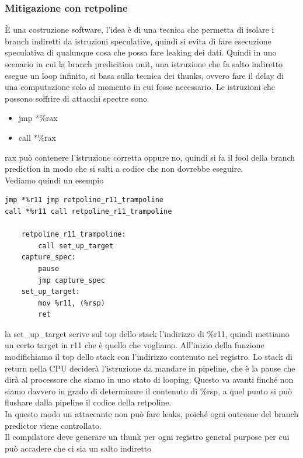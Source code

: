 \documentclass[12pt, oneside]{extbook} %
\begin{document}
\subsubsection{Mitigazione con retpoline}
È una costruzione software, l'idea è di una tecnica che permetta di isolare i branch indiretti da istruzioni speculative, quindi si evita di fare esecuzione speculativa di qualunque cosa che possa fare leaking dei dati. Quindi in uno scenario in cui la branch predicition unit, una istruzione che fa salto indiretto esegue un loop infinito, si basa sulla tecnica dei thunks, ovvero fare il delay di una computazione solo al momento in cui fosse necessario. Le istruzioni che possono soffrire di attacchi spectre sono
\begin{itemize}
\item jmp *\%rax
\item call *\%rax
\end{itemize}
rax può contenere l'istruzione corretta oppure no, quindi si fa il fool della branch prediction in modo che si salti a codice che non dovrebbe eseguire.\\Vediamo quindi un esempio
\begin{lstlisting}
jmp *%r11 jmp retpoline_r11_trampoline
call *%r11 call retpoline_r11_trampoline

	retpoline_r11_trampoline:
		call set_up_target
	capture_spec:
		pause
		jmp capture_spec
	set_up_target:
		mov %r11, (%rsp)
		ret
\end{lstlisting}
la \textsf{set\_up\_target} scrive sul top dello stack l'indirizzo di \%r11, quindi mettiamo un certo target in r11 che è quello che vogliamo. All'inizio della funzione modifichiamo il top dello stack con l'indirizzo contenuto nel registro. Lo stack di return nella CPU deciderà l'istruzione da mandare in pipeline, che è la pause che dirà al processore che siamo in uno stato di looping. Questo va avanti finché non siamo davvero in grado di determinare il contenuto di \%rsp, a quel punto si può flushare dalla pipeline il codice della retpoline.\\In questo modo un attaccante non può fare leaks, poiché ogni outcome del branch predictor viene controllato.\\Il compilatore deve generare un thunk per ogni registro general purpose per cui può accadere che ci sia un salto indiretto
\end{document}
